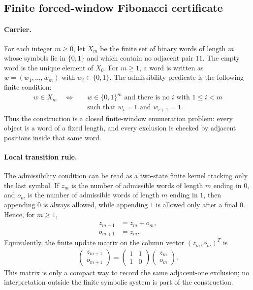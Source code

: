 
\subsection{Finite forced-window Fibonacci certificate}
\label{sec:f-a0-window6-fibonacci-sixframe-lock-certificate}

\paragraph{Carrier.}
For each integer $m \geq 0$, let $X_m$ be the finite set of binary words of length $m$ whose symbols lie in $\{0,1\}$ and which contain no adjacent pair $11$. The empty word is the unique element of $X_0$. For $m \geq 1$, a word is written as $w=(w_1,\ldots,w_m)$ with $w_i \in \{0,1\}$. The admissibility predicate is the following finite condition:
$$
\begin{aligned}
 w \in X_m
 \quad\Longleftrightarrow\quad
 &w \in \{0,1\}^m\text{ and there is no }i\text{ with }1\leq i<m\\
 &\text{such that }w_i=1\text{ and }w_{i+1}=1.
\end{aligned}
$$
Thus the construction is a closed finite-window enumeration problem: every object is a word of a fixed length, and every exclusion is checked by adjacent positions inside that same word.

\paragraph{Local transition rule.}
The admissibility condition can be read as a two-state finite kernel tracking only the last symbol. If $z_m$ is the number of admissible words of length $m$ ending in $0$, and $o_m$ is the number of admissible words of length $m$ ending in $1$, then appending $0$ is always allowed, while appending $1$ is allowed only after a final $0$. Hence, for $m\geq 1$,
$$
\begin{aligned}
 z_{m+1} &= z_m+o_m,\\
 o_{m+1} &= z_m.
\end{aligned}
$$
Equivalently, the finite update matrix on the column vector $(z_m,o_m)^T$ is
$$
\begin{aligned}
 \begin{pmatrix}z_{m+1}\\ o_{m+1}\end{pmatrix}
 =
 \begin{pmatrix}1&1\\ 1&0\end{pmatrix}
 \begin{pmatrix}z_m\\ o_m\end{pmatrix}.
\end{aligned}
$$
This matrix is only a compact way to record the same adjacent-one exclusion; no interpretation outside the finite symbolic system is part of the construction.

